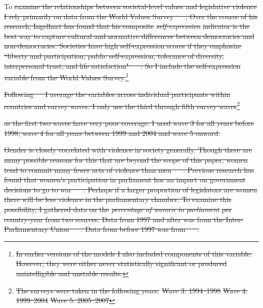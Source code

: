 \documentclass[a4paper]{article}\usepackage[]{graphicx}\usepackage[]{color}
\providecommand{\DIFdeltex}[1]{{\protect\color{red}\sout{#1}}}                      %
\providecommand{\DIFdelbegin}{} %
\providecommand{\DIFdel}[1]{\texorpdfstring{\DIFdeltex{#1}}{}} %
\begin{document}
To \DIFdelbegin \DIFdel{examine the relationships between societal-level values and legislative violence I rely primarily on data from the World Values Survey \mbox{%
\citeyearpar{WVS2009}
}%
. Over the course of his research, Ingelhart has found that his composite }%
\emph{\DIFdel{self-expression}}%
\DIFdel{indicator is the best way to capture cultural and normative differences between democracies and non-democracies. Societies have high self-expression scores if they emphasize ``liberty and participation, public self-expression, tolerance of diversity, interpersonal trust, and life satisfaction" \mbox{%
\citep[64]{Inglehart2003}
}%
. So I include the self-expression variable from the World Values Survey.}\footnote{\DIFdel{In earlier versions of the models I also included components of this variable. However, they were either never statistically significant or produced unintelligible and unstable results.}} %
\addtocounter{footnote}{-1}%
\DIFdel{Following \mbox{%
\cite{Inglehart2003}
}%
I average the variables across individual participants within countries and survey waves. I only use the third through fifth survey waves}\footnote{\DIFdel{The surveys were taken in the following years: }%
\DIFdel{Wave 3: 1994--1998 }%
\DIFdel{Wave 4: 1999--2004 }%
\DIFdel{Wave 5: 2005--2007}} %
\addtocounter{footnote}{-1}%
\DIFdel{as the first two waves have very poor coverage. I used wave 3 for all years before 1998, wave 4 for all years between 1999 and 2004 and wave 5 onward.
}%

\DIFdel{Gender is closely correlated with violence in society generally. Though there are many possible reasons for this that are beyond the scope of this paper, women tend to commit many fewer acts of violence than men \mbox{%
\citep[see][]{Schwartz2009}
}%
. Previous research has found that women's participation in parliament has an impact on government decisions to go to war \mbox{%
\citep{Melander2005}
}%
. Perhaps if a larger proportion of legislators are women there will be less violence in the parliamentary chamber. To examine this possibility, I gathered data on the }\emph{\DIFdel{percentage of women in parliament}} %
\DIFdel{per country-year from two sources. Data from 1997 and after was from the Inter-Parliamentary Union \mbox{%
\citeyearpar{IPU2013}
}%
. Data from before 1997 was from \mbox{%
\cite{Schwartz2009}
}%
.
}%
\end{document}
